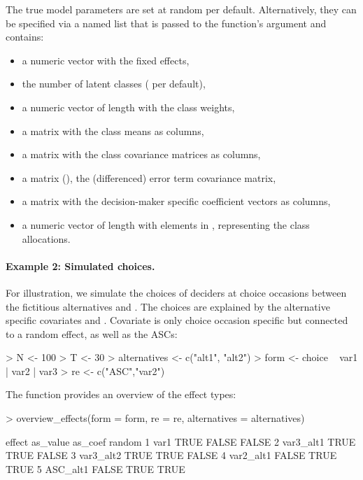 \documentclass[article]{jss}
\newcommand{\fct}[1]{\code{#1()}}
\begin{document}
The true model parameters are set at random per default. Alternatively, they can be specified via a named list that is passed to the function's  argument and contains:
\begin{itemize}
  \item a numeric vector  with the fixed effects,
  \item the number  of latent classes ( per default),
  \item a numeric vector  of length  with the class weights,
  \item a matrix  with the class means as columns,
  \item a matrix  with the class covariance matrices as columns,
  \item a matrix  (), the (differenced) error term covariance matrix,
  \item a matrix  with the decision-maker specific coefficient vectors as columns,
  \item a numeric vector  of length  with elements in , representing the class allocations.
\end{itemize}

\paragraph{Example 2: Simulated choices.} For illustration, we simulate the choices of  deciders at  choice occasions between the fictitious alternatives  and . The choices are explained by the alternative specific covariates  and . Covariate  is only choice occasion specific but connected to a random effect, as well as the ASCs:

\begin{Schunk}
\begin{Sinput}
> N <- 100
> T <- 30
> alternatives <- c("alt1", "alt2")
> form <- choice ~ var1 | var2 | var3
> re <- c("ASC","var2")
\end{Sinput}
\end{Schunk}

The \fct{overview\_effects} function provides an overview of the effect types:

\begin{Schunk}
\begin{Sinput}
> overview_effects(form = form, re = re, alternatives = alternatives)
\end{Sinput}
\begin{Soutput}
     effect as_value as_coef random
1      var1     TRUE   FALSE  FALSE
2 var3_alt1     TRUE    TRUE  FALSE
3 var3_alt2     TRUE    TRUE  FALSE
4 var2_alt1    FALSE    TRUE   TRUE
5  ASC_alt1    FALSE    TRUE   TRUE
\end{Soutput}
\end{Schunk}
\end{document}
